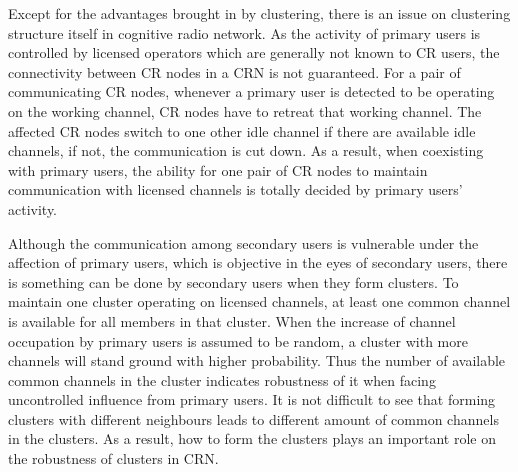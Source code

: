 
Except for the advantages brought in by clustering, there is an issue on clustering structure itself in cognitive radio network.
As the activity of primary users is controlled by licensed operators which are generally not known to CR users, the connectivity between CR nodes in a CRN is not guaranteed. 
For a pair of communicating CR nodes, whenever a primary user is detected to be operating on the working channel, CR nodes have to retreat that working channel.
The affected CR nodes switch to one other idle channel if there are available idle channels, if not, the communication is cut down.
As a result, when coexisting with primary users, the ability for one pair of CR nodes to maintain communication with licensed channels is totally decided by primary users' activity.

Although the communication among secondary users is vulnerable under the affection of primary users, which is objective in the eyes of secondary users, there is something can be done by secondary users when they form clusters. 
To maintain one cluster operating on licensed channels, at least one common channel is available for all members in that cluster.
When the increase of channel occupation by primary users is assumed to be random, a cluster with more channels will stand ground with higher probability.
Thus the number of available common channels in the cluster indicates robustness of it when facing uncontrolled influence from primary users.
It is not difficult to see that forming clusters with different neighbours leads to different amount of common channels in the clusters.
As a result, how to form the clusters plays an important role on the robustness of clusters in CRN.


